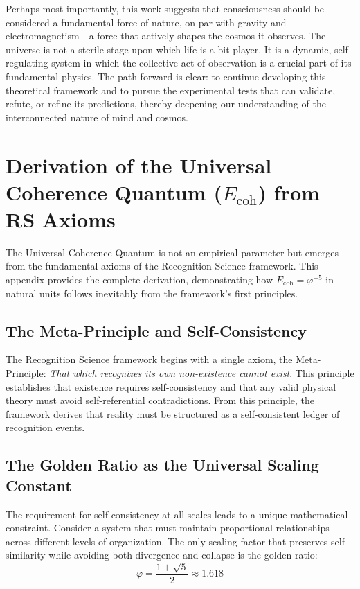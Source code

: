 \documentclass[11pt,a4paper]{article}
\theoremstyle{definition}
\theoremstyle{remark}
\begin{document}
Perhaps most importantly, this work suggests that consciousness should be considered a fundamental force of nature, on par with gravity and electromagnetism—a force that actively shapes the cosmos it observes. The universe is not a sterile stage upon which life is a bit player. It is a dynamic, self-regulating system in which the collective act of observation is a crucial part of its fundamental physics. The path forward is clear: to continue developing this theoretical framework and to pursue the experimental tests that can validate, refute, or refine its predictions, thereby deepening our understanding of the interconnected nature of mind and cosmos.

\appendix

\section{Derivation of the Universal Coherence Quantum (\(E_{\text{coh}}\)) from RS Axioms}

The Universal Coherence Quantum is not an empirical parameter but emerges from the fundamental axioms of the Recognition Science framework. This appendix provides the complete derivation, demonstrating how \(E_{\text{coh}} = \varphi^{-5}\) in natural units follows inevitably from the framework's first principles.

\subsection{The Meta-Principle and Self-Consistency}

The Recognition Science framework begins with a single axiom, the Meta-Principle: \textit{That which recognizes its own non-existence cannot exist}. This principle establishes that existence requires self-consistency and that any valid physical theory must avoid self-referential contradictions. From this principle, the framework derives that reality must be structured as a self-consistent ledger of recognition events.

\subsection{The Golden Ratio as the Universal Scaling Constant}

The requirement for self-consistency at all scales leads to a unique mathematical constraint. Consider a system that must maintain proportional relationships across different levels of organization. The only scaling factor that preserves self-similarity while avoiding both divergence and collapse is the golden ratio:
\begin{equation}
    \varphi = \frac{1 + \sqrt{5}}{2} \approx 1.618
\end{equation}
\end{document}
